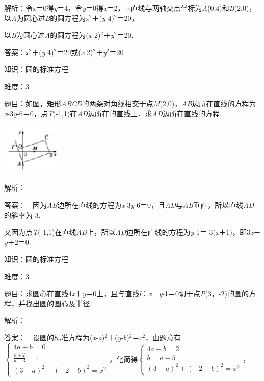 \documentclass{article} %
\begin{document}
解析：令\textit{x}＝0得\textit{y}＝4，令\textit{y}＝0得\textit{x}＝2，
$\mathrm{\therefore}$直线与两轴交点坐标为\textit{A}(0,4)和\textit{B}(2,0)，以\textit{A}为圆心过\textit{B}的圆方程为\textit{x}${}^{2}$＋(\textit{y}-4)${}^{2}$＝20，

以\textit{B}为圆心过\textit{A}的圆方程为(\textit{x}-2)${}^{2}$＋\textit{y}${}^{2}$＝20.

答案：\textit{x}${}^{2}$＋(\textit{y}-4)${}^{2}$＝20或(\textit{x}-2)${}^{2}$＋\textit{y}${}^{2}$＝20


知识：圆的标准方程

难度：3

题目：如图，矩形\textit{ABCD}的两条对角线相交于点\textit{M}(2,0)，\textit{AB}边所在直线的方程为\textit{x}-3\textit{y}-6＝0，点\textit{T}(-1,1)在\textit{AD}边所在的直线上．求\textit{AD}边所在直线的方程.

\includegraphics*[width=1.14in, height=0.98in, keepaspectratio=false]{image289}

解析：

答案：　因为\textit{AB}边所在直线的方程为\textit{x}-3\textit{y}-6＝0，且\textit{AD}与\textit{AB}垂直，所以直线\textit{AD}的斜率为-3.

又因为点\textit{T}(-1,1)在直线\textit{AD}上，所以\textit{AD}边所在直线的方程为\textit{y}-1＝-3(\textit{x}＋1)，即3\textit{x}＋\textit{y}＋2＝0.

知识：圆的标准方程

难度：3

题目：求圆心在直线4\textit{x}＋\textit{y}＝0上，且与直线\textit{l}：\textit{x}＋\textit{y}-1＝0切于点\textit{P}(3，-2)的圆的方程，并找出圆的圆心及半径.

解析：

答案：　设圆的标准方程为(\textit{x}-\textit{a})${}^{2}$＋(\textit{y}-\textit{b})${}^{2}$＝\textit{r}${}^{2}$，由题意有$\left\{\begin{array}{r} 4a+b=0\\ \frac{b+2}{a-3}=1\\ (3-a)^2+(-2-b)^2=x^2 \end{array} \right.$，化简得$\left\{\begin{array}{r} 4a+b=2\\ b=a-5\\ (3-a)^2+(-2-b)^2=x^2 \end{array} \right.$，
\end{document}
